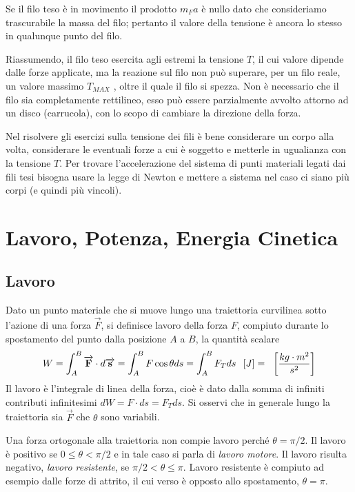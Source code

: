 \documentclass[class=book, crop=false, oneside, 12pt]{standalone}
\begin{document}
Se il filo teso è in movimento il prodotto \(m_F a\) è nullo dato che consideriamo trascurabile la massa del filo; pertanto il valore della tensione è ancora lo stesso in qualunque punto del filo.

Riassumendo, il filo teso esercita agli estremi la tensione \(T\), il cui valore dipende dalle forze applicate, ma la reazione sul filo non può superare, per un filo reale, un valore massimo \(T_{MAX}\) , oltre il quale il filo si spezza.\newline
Non è necessario che il filo sia completamente rettilineo, esso può essere parzialmente avvolto attorno ad un disco (carrucola), con lo scopo di cambiare la direzione della forza. 

Nel risolvere gli esercizi sulla tensione dei fili è bene considerare un corpo alla volta, considerare le eventuali forze a cui è soggetto e metterle in ugualianza con la tensione \(T\).
Per trovare l'accelerazione del sistema di punti materiali legati dai fili tesi bisogna usare la legge di Newton e mettere a sistema nel caso ci siano più corpi (e quindi più vincoli).

\section{Lavoro, Potenza, Energia Cinetica}

\subsection{Lavoro}

Dato un punto materiale che si muove lungo una traiettoria curvilinea sotto l'azione di una forza \(\overrightarrow{F}\), si definisce lavoro della forza \(F\), compiuto durante lo spostamento del punto dalla posizione \(A\) a \(B\), la quantità scalare
\begin{equation}
    W = \int_A^B \overrightarrow{F} \cdot d \overrightarrow{s} = \int_A^B F \cos \theta ds = \int_A^B F_T ds \udm{J} = \udm{\frac{kg \cdot m^2}{s^2}}
\end{equation} 
Il lavoro è l'integrale di linea della forza, cioè è dato dalla somma di infiniti contributi infinitesimi \(d W = F \cdot d s = F_T d s\).
Si osservi che in generale lungo la traiettoria sia \(\overrightarrow{F}\) che \(\theta\) sono variabili.

Una forza ortogonale alla traiettoria non compie lavoro perché \(\theta = \pi / 2 \). 
Il lavoro è positivo se \(0 \leq \theta < \pi / 2\) e in tale caso si parla di \emph{lavoro motore}. 
Il lavoro risulta negativo, \emph{lavoro resistente}, se \(\pi / 2 < \theta \leq \pi \). 
Lavoro resistente è compiuto ad esempio dalle forze di attrito, il cui verso è opposto allo spostamento, \(\theta = \pi\). 
\end{document}
